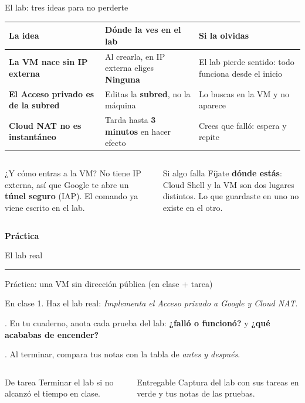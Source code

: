 \documentclass[aspectratio=169,10pt,c]{beamer}
\newcommand{\separador}[2]{%
\begin{frame}[plain]
\vfill
\begin{center}
{\fontsize{29}{34}\selectfont\bfseries #1}\par
\vspace{2mm}
{\small #2}\par
\vspace{4mm}
{\color{utpRojo}\rule{8.5cm}{1.2pt}}
\end{center}
\vfill
\end{frame}}
\begin{document}
\begin{frame}{El lab: tres ideas para no perderte}
\renewcommand{\arraystretch}{1.45}
\centering\small
\begin{tabular}{@{}>{\raggedright\arraybackslash}p{4.3cm}>{\raggedright\arraybackslash}p{4.6cm}>{\raggedright\arraybackslash}p{4.0cm}@{}}
\toprule
\textbf{La idea} & \textbf{Dónde la ves en el lab} & \textbf{Si la olvidas}\\
\midrule
\textbf{La VM nace sin IP externa} & Al crearla, en IP externa eliges \textbf{Ninguna} & El lab pierde sentido: todo funciona desde el inicio\\
\textbf{El Acceso privado es de la subred} & Editas la \textbf{subred}, no la máquina & Lo buscas en la VM y no aparece\\
\textbf{Cloud NAT no es instantáneo} & Tarda hasta \textbf{3 minutos} en hacer efecto & Crees que falló: espera y repite\\
\bottomrule
\end{tabular}
\par\vspace{3mm}
\begin{columns}[T,onlytextwidth]
\begin{exampleblock}{¿Y cómo entras a la VM?}
\small No tiene IP externa, así que Google te abre un \textbf{túnel seguro} (IAP). El comando ya viene escrito en el lab.
\end{exampleblock}
\begin{alertblock}{Si algo falla}
\small Fíjate \textbf{dónde estás}: Cloud Shell y la VM son dos lugares distintos. Lo que guardaste en uno no existe en el otro.
\end{alertblock}
\end{columns}
\end{frame}

\separador{Práctica}{El lab real}

\begin{frame}{Práctica: una VM sin dirección pública \textnormal{\small(en clase + tarea)}}
\begin{block}{En clase}
\small
1. Haz el lab real: \emph{Implementa el Acceso privado a Google y Cloud NAT}.\par{}. En tu cuaderno, anota cada prueba del lab: \textbf{¿falló o funcionó?} y \textbf{¿qué acababas de encender?}\par{}. Al terminar, compara tus notas con la tabla de \emph{antes y después}.
\end{block}
\begin{columns}[T,onlytextwidth]
\begin{exampleblock}{De tarea}
\small Terminar el lab si no alcanzó el tiempo en clase.
\end{exampleblock}
\begin{alertblock}{Entregable}
\small Captura del lab con sus tareas en verde y tus notas de las pruebas.
\end{alertblock}
\end{columns}
\end{frame}
\end{document}
